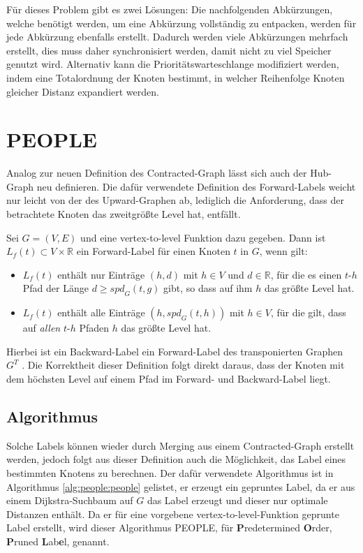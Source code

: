 Für dieses Problem gibt es zwei Lösungen:
Die nachfolgenden Abkürzungen, welche benötigt werden, um eine Abkürzung vollständig zu entpacken, werden für jede Abkürzung ebenfalls erstellt.
Dadurch werden viele Abkürzungen mehrfach erstellt, dies muss daher synchronisiert werden, damit nicht zu viel Speicher genutzt wird.
Alternativ kann die Prioritätswarteschlange modifiziert werden, indem eine Totalordnung der Knoten bestimmt, in welcher Reihenfolge Knoten gleicher Distanz expandiert werden.

\section{PEOPLE}

Analog zur neuen Definition des Contracted-Graph lässt sich auch der Hub-Graph neu definieren.
Die dafür verwendete Definition des Forward-Labels weicht nur leicht von der des Upward-Graphen ab, lediglich die Anforderung, dass der betrachtete Knoten das zweitgrößte Level hat, entfällt.

\begin{definition}
  Sei $G = (V, E)$ und eine vertex-to-level Funktion dazu gegeben.
  Dann ist $L_f (t) \subset V \times \mathbb{R}$ ein Forward-Label für einen Knoten $t$ in $G$, wenn gilt:

  \begin{itemize}
    \item
          $L_f (t)$ enthält nur Einträge $(h, d)$ mit $h \in V$ und $d \in \mathbb{R}$, für die es einen $t$-$h$ Pfad der Länge $d \geq {spd}_G (t, g)$ gibt, so dass auf ihm $h$ das größte Level hat.

    \item
          $L_f (t)$ enthält alle Einträge $(h, {spd}_G (t, h))$ mit $h \in V$, für die gilt, dass auf \emph{allen} $t$-$h$ Pfaden $h$ das größte Level hat.
  \end{itemize}
\end{definition}


Hierbei ist ein Backward-Label ein Forward-Label des transponierten Graphen $G^T$ .
Die Korrektheit dieser Definition folgt direkt daraus, dass der Knoten mit dem höchsten Level auf einem Pfad im Forward- und Backward-Label liegt.

\subsection{Algorithmus}

Solche Labels können wieder durch Merging aus einem Contracted-Graph erstellt werden, jedoch folgt aus dieser Definition auch die Möglichkeit, das Label eines bestimmten Knotens zu berechnen.
Der dafür verwendete Algorithmus ist in Algorithmus \ref{alg:people:people} gelistet, er erzeugt ein gepruntes Label, da er aus einem Dijkstra-Suchbaum auf $G$ das Label erzeugt und dieser nur optimale Distanzen enthält.
Da er für eine vorgebene vertex-to-level-Funktion geprunte Label erstellt, wird dieser Algorithmus PEOPLE, für \textbf{P}redetermined \textbf{O}rder, \textbf{P}runed \textbf{L}ab\textbf{e}l, genannt.

